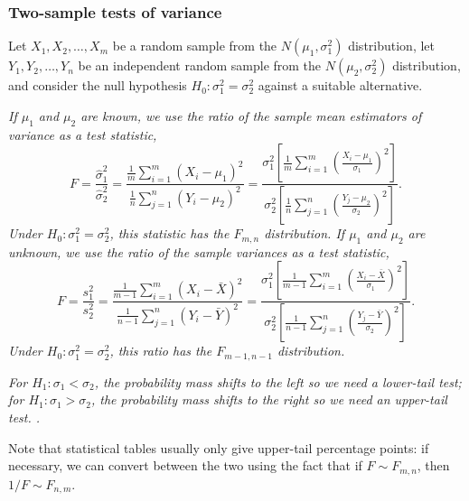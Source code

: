 \subsubsection{Two-sample tests of variance}
Let $X_1,X_2,\ldots,X_m$ be a random sample from the $N(\mu_1,\sigma_1^2)$ distribution, let $Y_1,Y_2,\ldots,Y_n$ be an independent random sample from the $N(\mu_2,\sigma_2^2)$ distribution, and consider the null hypothesis $H_0:\sigma_1^2 = \sigma_2^2$ against a suitable alternative. 


\ben
\it %
If $\mu_1$ and $\mu_2$ are known, we use the ratio of the sample mean estimators of variance as a test statistic,
\[
F 	= \frac{\hat{\sigma}_1^2}{\hat{\sigma}_2^2}
	= \frac{\displaystyle\frac{1}{m}\sum_{i=1}^m (X_i-\mu_1)^2}{\displaystyle\frac{1}{n}\sum_{j=1}^n (Y_i-\mu_2)^2}
	= \frac{
		\displaystyle\sigma_1^2\left[\frac{1}{m}\sum_{i=1}^m \left(\frac{X_i-\mu_1}{\sigma_1}\right)^2\right]
	}{
		\displaystyle\sigma_2^2\left[\frac{1}{n}\sum_{j=1}^n \left(\frac{Y_j-\mu_2}{\sigma_2}\right)^2\right]
	}.
\]
Under $H_0:\sigma_1^2 = \sigma_2^2$, this statistic has the $F_{m,n}$ distribution.
\it %
If $\mu_1$ and $\mu_2$ are unknown, we use the ratio of the sample variances as a test statistic,
\[
F 	= \frac{s_1^2}{s_2^2}
	= \frac{\displaystyle\frac{1}{m-1}\sum_{i=1}^m (X_i-\bar{X})^2}{\displaystyle\frac{1}{n-1}\sum_{j=1}^n (Y_i-\bar{Y})^2}
	= \frac{
		\displaystyle\sigma_1^2\left[\frac{1}{m-1}\sum_{i=1}^m \left(\frac{X_i-\bar{X}}{\sigma_1}\right)^2\right]
	}{
		\displaystyle\sigma_2^2\left[\frac{1}{n-1}\sum_{j=1}^n \left(\frac{Y_j-\bar{Y}}{\sigma_2}\right)^2\right]
	}.
\]
Under $H_0:\sigma_1^2 = \sigma_2^2$, this ratio has the $F_{m-1,n-1}$ distribution.
\een

\bit
\it For $H_1:\sigma_1<\sigma_2$, the probability mass shifts to the left so we need a lower-tail test;
\it for $H_1:\sigma_1>\sigma_2$, the probability mass shifts to the right so we need an upper-tail test.
\eit.

Note that statistical tables usually only give upper-tail percentage points: if necessary, we can convert between the two using the fact that if $F\sim F_{m,n}$, then $1/F\sim F_{n,m}$.

